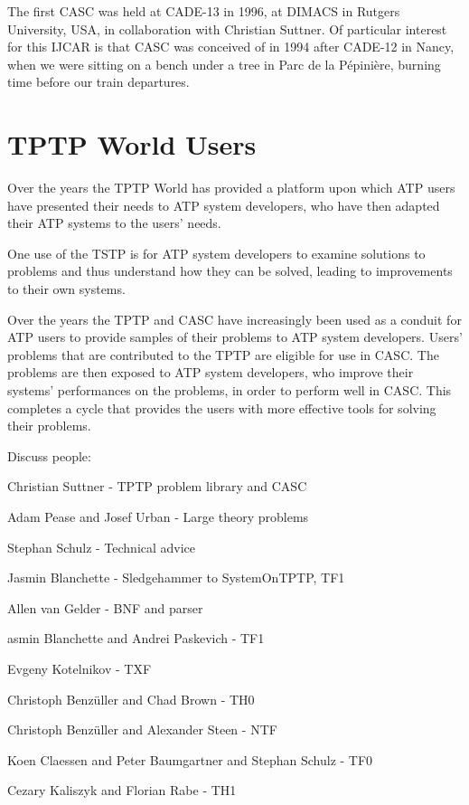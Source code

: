 \documentclass{easychair}
\newenvironment{packed_itemize}{
\vspace*{-0.2em}
\begin{itemize}
\setlength{\partopsep}{0pt}
\setlength{\itemsep}{1pt}
\setlength{\parskip}{0pt}
\setlength{\parsep}{0pt}
}{\end{itemize}}
\begin{document}
The first CASC was held at CADE-13 in 1996, at DIMACS in Rutgers University, USA, in collaboration
with Christian Suttner.
Of particular interest for this IJCAR is that CASC was conceived of in 1994 after CADE-12 in
Nancy, when we were sitting on a bench under a tree in Parc de la Pépinière, burning time before
our train departures.

\section{TPTP World Users}
\label{Users}

Over the years the TPTP World has provided a platform upon which ATP users have presented their 
needs to ATP system developers, who have then adapted their ATP systems to the users’ needs.

One use of the TSTP is for ATP system developers to examine solutions to problems and thus 
understand how they can be solved, leading to improvements to their own systems. 

Over the years the TPTP and CASC have increasingly been used as a conduit for ATP users to provide 
samples of their problems to ATP system developers.
Users' problems that are contributed to the TPTP are eligible for use in CASC.
The problems are then exposed to ATP system developers, who improve their systems' performances 
on the problems, in order to perform well in CASC.
This completes a cycle that provides the users with more effective tools for solving their 
problems.

Discuss people:
\begin{packed_itemize}
\item Christian Suttner - TPTP problem library and CASC
\item Adam Pease and Josef Urban - Large theory problems
\item Stephan Schulz - Technical advice
\item Jasmin Blanchette - Sledgehammer to SystemOnTPTP, TF1
\item Allen van Gelder - BNF and parser
\item asmin Blanchette and Andrei Paskevich - TF1
\item Evgeny Kotelnikov - TXF
\item Christoph Benz{\"u}ller and Chad Brown - TH0
\item Christoph Benz{\"u}ller and Alexander Steen - NTF
\item Koen Claessen and Peter Baumgartner and Stephan Schulz - TF0
\item Cezary Kaliszyk and Florian Rabe - TH1
\end{packed_itemize}
\end{document}
